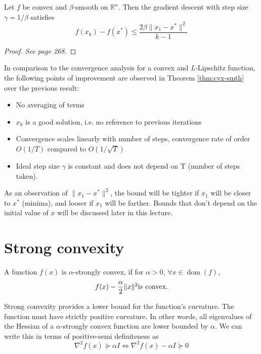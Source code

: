\documentclass{article}
\DeclareMathOperator*{\dom}{dom}
\DeclarePairedDelimiter{\norm}{\lVert}{\rVert}
\begin{document}
\begin{thm}\label{thm:cvx-smth}
Let $f$ be convex and $\beta$-smooth on $\mathbb{R}^n$. Then the gradient descent with step size $\gamma = 1/\beta$ satisfies
\[
	f(x_{k}) - f(x^{*}) \leq \dfrac{2 \beta \| x_1 - x^{*} \|^2}{k-1}
\]
\end{thm}

\begin{proof}
\textit{See \cite{bubeck2015convex} page 268.}
\end{proof}


In comparison to the convergence analysis for a convex and \textit{L-}Lipschitz function, the following points of improvement are observed in Theorem \ref{thm:cvx-smth} over the previous result:

\begin{itemize}
\item No averaging of terms 
\item $x_{k}$  is a good solution, i.e. no reference to previous iterations
\item Convergence scales linearly with number of steps, convergence rate of order $O(1/T)$ compared to $O(1/\sqrt{T})$
\item Ideal step size $\gamma$ is constant and does not depend on T (number of steps taken).
\end{itemize}
As an observation of ${\| x_1 - x^{*} \|^2}$, the bound will be tighter if $x_1$ will be closer to $x^{*}$ (minima), and looser if $x_1$ will be farther. Bounds that don't depend on the initial value of $x$ will be discussed later in this lecture.

\section{Strong convexity}

\begin{defn}
A function $f(x)$ is $\alpha$-strongly convex, if for $\alpha>0$, $\forall x\in\dom(f)$, 
\begin{align*}
f(x) - \frac{\alpha}{2} \norm{x}^2 \text{is convex.}
\end{align*}
\end{defn}

Strong convexity provides a lower bound for the function's curvature. The function must have strictly positive curvature. In other words, all eigenvalues of the Hessian of a $\alpha$-strongly convex function are lower bounded by $\alpha$. We can write this in terms of positive-semi definiteness as
\[
\nabla^2 f(x) \succeq \alpha I  \iff  \nabla^2 f(x) - \alpha I \succeq 0
\]
\end{document}
